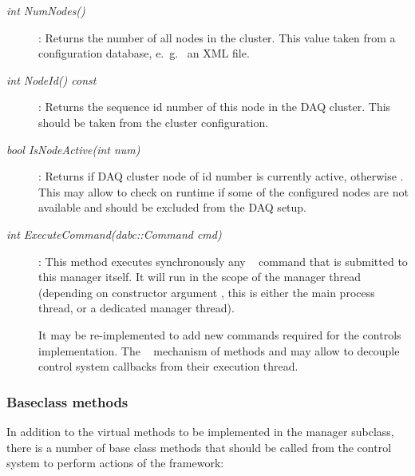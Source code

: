 \begin{description}
\item[\em int NumNodes()] :
Returns the number of all nodes in the cluster. This value taken
from a configuration database, e.~g.~ an XML file.

\item[\em int NodeId() const] : 
Returns the sequence id number of this node in the DAQ cluster.
This should be taken from the cluster configuration.

\item[\em bool IsNodeActive(int num)] : 
Returns  if DAQ cluster node of id number 
is currently active, otherwise . 
This may allow to check on runtime if some of the
configured nodes are not available and should be excluded from the
DAQ setup.


\item[\em int ExecuteCommand(dabc::Command cmd)] :
This method executes synchronously any
\dabc~ command that is submitted to this manager itself.
It will run in the scope of the manager thread
(depending on constructor argument , 
this is either the main process thread, or a dedicated manager thread).

It may be re-implemented to add new commands required for the
controls implementation. The \dabc~ mechanism of
methods  and  may allow
to decouple control system callbacks from their execution thread.

 
\end{description}


\subsubsection{Baseclass methods}
\label{prog_manager_controls_base}
In addition to the virtual methods to be implemented in the manager subclass,
there is a number of  base class methods 
that should be called from the control system to perform actions of the 
framework:

